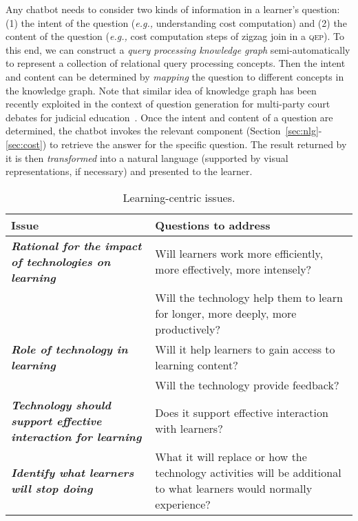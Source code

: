 \documentclass[11pt]{article}
\newcommand{\eg}{\emph{e.g.,}\xspace}
\begin{document}
Any chatbot needs to consider two kinds of information in a learner's question: (1) the intent of the question (\eg understanding cost computation) and (2) the content of the question (\eg cost computation steps of zigzag join in a \textsc{qep}).  To this end, we can construct a \textit{query processing knowledge graph} semi-automatically to represent a collection of relational query processing concepts. Then the intent and content can be determined by \textit{mapping} the question to different concepts in the knowledge graph. Note that similar idea of knowledge graph has been recently exploited in the context of question generation for multi-party court debates for judicial education~\cite{ZJ+22}. Once the intent and content of a question are determined, the chatbot invokes the relevant component (Section~\ref{sec:nlg}-\ref{sec:cost}) to retrieve the answer for the specific question. The result returned by it is then \textit{transformed} into a natural language (supported by visual representations, if necessary) and presented to the learner.

   

  \begin{table*}[t]
\centering
 \caption{\label{tab:learn}Learning-centric issues.}
 \scriptsize
 \begin{tabular}{|p{70mm}|p{77mm}|}
  \hline
  \textbf{Issue} & \textbf{Questions to address}  \\
  \hline
 \textbf{ \textit{Rational for the impact of technologies on learning}} & Will learners work more efficiently, more effectively, more intensely? \\
 & Will the technology help them to learn for longer, more deeply, more productively? \\ \hline
\textbf{\textit{Role of technology in learning}} & Will it help learners to gain access to learning content? \\
& Will the technology provide feedback?\\ \hline
 \textbf{\textit{Technology should support effective interaction for learning}} & Does it support effective interaction with learners?\\ \hline
 \textbf{\textit{Identify what learners will stop doing}} & What it will replace or how the technology activities will be additional to what learners would normally experience?\\
  \hline
 \end{tabular}
\end{table*}
 
\end{document}
